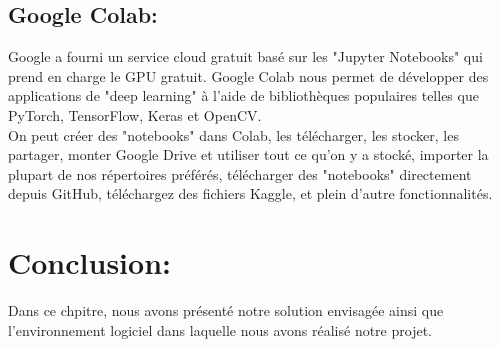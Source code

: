\subsection{Google Colab:}
Google a fourni un service cloud gratuit basé sur les "Jupyter Notebooks" qui prend en charge le GPU gratuit. Google Colab nous permet de développer des applications de "deep learning" à l'aide de bibliothèques populaires telles que PyTorch, TensorFlow, Keras et OpenCV.\\

On peut créer des "notebooks" dans Colab, les télécharger, les stocker, les partager, monter Google Drive et utiliser tout ce qu'on y a stocké, importer la plupart de nos répertoires préférés, télécharger des "notebooks" directement depuis GitHub, téléchargez des fichiers Kaggle, et plein d'autre fonctionnalités.\cite{googlecolab}
\section{Conclusion:}
Dans ce chpitre, nous avons présenté notre solution envisagée ainsi que l'environnement logiciel dans laquelle nous avons réalisé notre projet.




